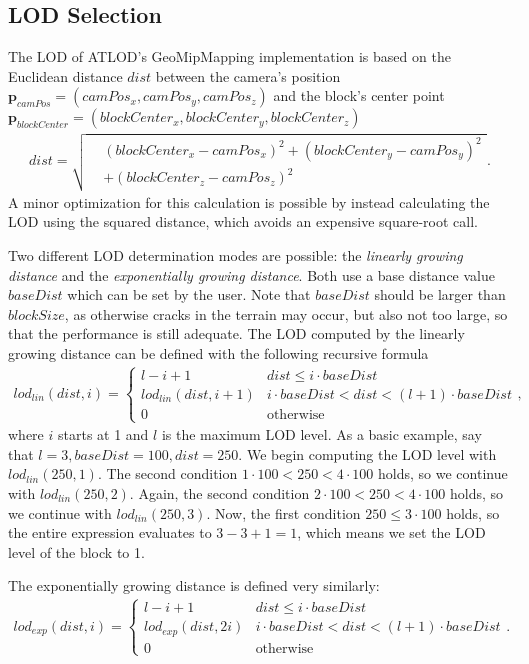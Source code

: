 \subsection{LOD Selection}
The LOD of ATLOD's GeoMipMapping implementation is based on the Euclidean distance $dist$ between 
the camera's position $\mathbf{p}_{camPos} = (camPos_x, camPos_y, camPos_z)$ 
and the block's center point $\mathbf{p}_{blockCenter} = (blockCenter_x, blockCenter_y, blockCenter_z)$
\begin{align*}
  dist = \sqrt{ \begin{aligned} & (blockCenter_x - camPos_x)^2 + (blockCenter_y - camPos_y)^2 \\
          & + (blockCenter_z-camPos_z)^2 \end{aligned}}.
\end{align*}
A minor optimization for this calculation is possible by instead calculating the LOD using the squared distance, 
which avoids an expensive square-root call.

Two different LOD determination modes are possible: the \textit{linearly growing distance} and the \textit{exponentially growing distance}.
Both use a base distance value $baseDist$ which 
can be set by the user. Note that $baseDist$ should be larger than $blockSize$,
as otherwise cracks in the terrain may occur, but also not too large, 
so that the performance is still adequate.
The LOD computed by the linearly growing distance can be defined with the following recursive formula
\begin{align*}
  lod_{lin}(dist, i) = 
  \begin{cases}
    l - i  + 1& dist \leq i \cdot baseDist\\
    lod_{lin}(dist, i + 1) & i \cdot baseDist < dist < (l + 1) \cdot baseDist\\
    0 & \text{otherwise}
  \end{cases},
\end{align*}
where $i$ starts at 1 and $l$ is the maximum LOD level.
As a basic example, say that $l=3,baseDist=100,dist=250$.
We begin computing the LOD level with $lod_{lin}(250,1)$.
The second condition $1 \cdot 100 < 250 < 4 \cdot 100$ holds, so we continue with $lod_{lin}(250,2)$.
Again, the second condition $2 \cdot 100 < 250 < 4 \cdot 100$ holds, so we continue with $lod_{lin}(250,3)$.
Now, the first condition $250 \leq 3 \cdot 100$ holds, so the entire expression evaluates to $3-3+1=1$,
which means we set the LOD level of the block to 1.

The exponentially growing distance is defined very similarly:
\begin{align*}
  lod_{exp}(dist, i) = 
  \begin{cases}
    l - i + 1 & dist \leq i \cdot baseDist\\
    lod_{exp}(dist, 2i) & i \cdot baseDist < dist < (l+1) \cdot baseDist\\
    0 & \text{otherwise}
  \end{cases}.
\end{align*}

